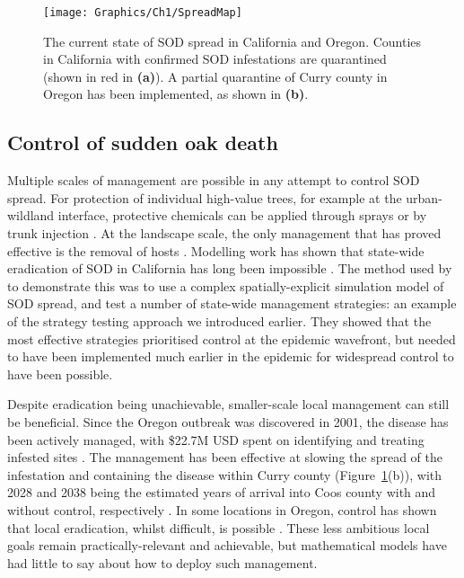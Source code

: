 \begin{figure}
    \begin{center}
        \texttt{[image: Graphics/Ch1/SpreadMap]}
        \caption[Current state of SOD in California and Oregon]{The current state of SOD spread in California and Oregon. Counties in California with confirmed SOD infestations are quarantined (shown in red in \textbf{(a)}). A partial quarantine of Curry county in Oregon has been implemented, as shown in \textbf{(b)}.\label{fig:ch1:map}}
    \end{center}
\end{figure}

\subsection{Control of sudden oak death}

Multiple scales of management are possible in any attempt to control SOD spread. For protection of individual high-value trees, for example at the urban-wildland interface, protective chemicals can be applied through sprays or by trunk injection \citep{garbelotto_phosphonate_2009}. At the landscape scale, the only management that has proved effective is the removal of hosts \citep{hansen_epidemiology_2008}. Modelling work has shown that state-wide eradication of SOD in California has long been impossible \citep{cunniffe_modelling_2016}. The method used by \citet{cunniffe_modelling_2016} to demonstrate this was to use a complex spatially-explicit simulation model of SOD spread, and test a number of state-wide management strategies: an example of the strategy testing approach we introduced earlier. They showed that the most effective strategies prioritised control at the epidemic wavefront, but needed to have been implemented much earlier in the epidemic for widespread control to have been possible.

Despite eradication being unachievable, smaller-scale local management can still be beneficial. Since the Oregon outbreak was discovered in 2001, the disease has been actively managed, with \$22.7M USD spent on identifying and treating infested sites \citep{grunwald_ecology_2019}. The management has been effective at slowing the spread of the infestation and containing the disease within Curry county (Figure~\ref{fig:ch1:map}(b)), with 2028 and 2038 being the estimated years of arrival into Coos county with and without control, respectively \citep{sod_economics_assessment}. In some locations in Oregon, control has shown that local eradication, whilst difficult, is possible \citep{hansen_efficacy_2019}. These less ambitious local goals remain practically-relevant and achievable, but mathematical models have had little to say about how to deploy such management.

